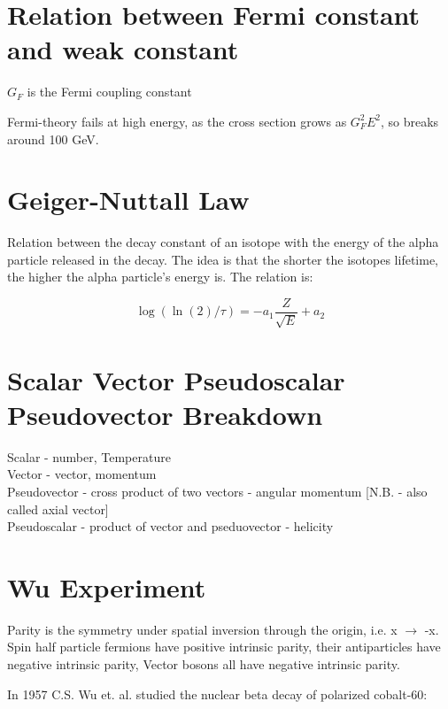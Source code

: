         
        \section{Relation between Fermi constant and weak constant}
            \indent $G_F$ is the Fermi coupling constant
        
        Fermi-theory fails at high energy, as the cross section grows as $G_F^2E^2$, so breaks around 100 GeV. 
        
        
        \section{Geiger-Nuttall Law}
            \indent Relation between the decay constant of an isotope with the energy of the alpha particle released in the decay. The idea is that the shorter the isotopes lifetime, the higher the alpha particle's energy is. The relation is:
            
            \begin{equation}
                \log(\ln(2)/\tau) = -a_1\frac{Z}{\sqrt{E}} + a_2
            \end{equation}
            
    \section{Scalar Vector Pseudoscalar Pseudovector Breakdown}
        \indent Scalar - number, Temperature\\
        \indent Vector - vector, momentum\\
        \indent Pseudovector - cross product of two vectors - angular momentum [N.B. - also called axial vector]\\
        \indent Pseudoscalar - product of vector and pseduovector - helicity \\
        
            
    
    \section{Wu Experiment}
        \indent Parity is the symmetry under spatial inversion through the origin, i.e. x $\longrightarrow$ -x. Spin half particle fermions have positive intrinsic parity, their antiparticles have negative intrinsic parity, Vector bosons all have negative intrinsic parity. 
        
        In 1957 C.S. Wu et. al. studied the nuclear beta decay of polarized cobalt-60:
        
